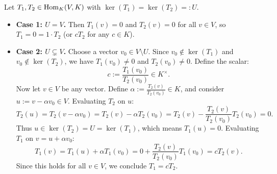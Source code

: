 \begin{exercisesolution}
\label{sol:functionals_same_kernel_proportional}
Let $T_1, T_2 \in \operatorname{Hom}_K(V, K)$ with $\ker(T_1) = \ker(T_2) =: U$.
\begin{itemize}
    \item \textbf{Case 1: $U = V$.}
    Then $T_1(v) = 0$ and $T_2(v) = 0$ for all $v \in V$, so $T_1 = 0 = 1 \cdot T_2$ (or $c T_2$ for any $c \in K$).

    \item \textbf{Case 2: $U \subsetneq V$.}
    Choose a vector $v_0 \in V \setminus U$. Since $v_0 \notin \ker(T_1)$ and $v_0 \notin \ker(T_2)$, we have $T_1(v_0) \ne 0$ and $T_2(v_0) \ne 0$.
    Define the scalar:
    \[
    c := \frac{T_1(v_0)}{T_2(v_0)} \in K^\times.
    \]
    Now let $v \in V$ be any vector. Define $\alpha := \frac{T_2(v)}{T_2(v_0)} \in K$, and consider $u := v - \alpha v_0 \in V$.
    Evaluating $T_2$ on $u$:
    \[
    T_2(u) = T_2(v - \alpha v_0) = T_2(v) - \alpha T_2(v_0) = T_2(v) - \frac{T_2(v)}{T_2(v_0)} T_2(v_0) = 0.
    \]
    Thus $u \in \ker(T_2) = U = \ker(T_1)$, which means $T_1(u) = 0$.
    Evaluating $T_1$ on $v = u + \alpha v_0$:
    \[
    T_1(v) = T_1(u) + \alpha T_1(v_0) = 0 + \frac{T_2(v)}{T_2(v_0)} T_1(v_0) = c T_2(v).
    \]
    Since this holds for all $v \in V$, we conclude $T_1 = c T_2$.
\end{itemize}
\end{exercisesolution}

